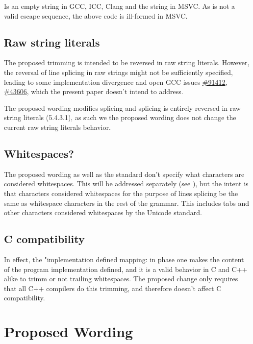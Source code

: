\documentclass{wg21}
\begin{document}
Is an empty string in GCC, ICC, Clang and the string  in MSVC.
As  is not a valid escape sequence, the above code is ill-formed in MSVC.

\subsection{Raw string literals}

The proposed trimming is intended to be reversed in raw string literals.
However, the reversal of line splicing in raw strings might not be sufficiently specified, leading to some implementation divergence
and open GCC issues \href{https://gcc.gnu.org/bugzilla/show_bug.cgi?id=91412}{\#91412}, \href{https://gcc.gnu.org/bugzilla/show_bug.cgi?id=43606}{\#43606},
which the present paper doesn't intend to address.

The proposed wording modifies splicing and splicing is entirely reversed in raw string literals (5.4.3.1), as such we the proposed wording does not change
the current raw string literals behavior.

\subsection{Whitespaces?}

The proposed wording as well as the standard don't specify what characters are considered whitespaces.
This will be addressed separately (see ), but the intent is that characters considered whitespaces for the purpose of lines splicing be the same
as whitespace characters in the rest of the grammar. This includes tabs and other characters considered whitespaces by the Unicode standard. 


\subsection{C compatibility}

In effect, the "implementation defined mapping: in phase one makes the content of the program implementation defined,
and it is a valid behavior in C and C++ alike to trimm or not trailing whitespaces.
The proposed change only requires that all C++ compilers do this trimming, and therefore doesn't affect C compatibility. 

\section{Proposed Wording}
\end{document}
